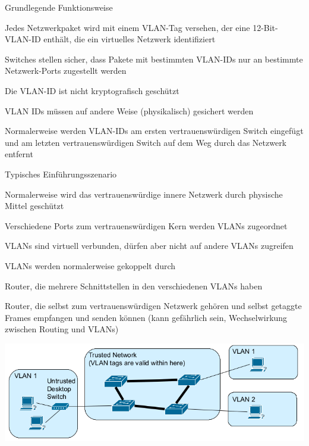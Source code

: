 \documentclass[a4paper]{article}
\begin{document}
\begin{multicols}{3}
      Grundlegende Funktionsweise
      \begin{itemize*}
            \item Jedes Netzwerkpaket wird mit einem VLAN-Tag versehen, der eine 12-Bit-VLAN-ID enthält, die ein virtuelles Netzwerk identifiziert
            \item Switches stellen sicher, dass Pakete mit bestimmten VLAN-IDs nur an bestimmte Netzwerk-Ports zugestellt werden %
            \item Die VLAN-ID ist nicht kryptografisch geschützt
            \item VLAN IDs müssen auf andere Weise (physikalisch) gesichert werden
            \item Normalerweise werden VLAN-IDs am ersten vertrauenswürdigen Switch eingefügt und am letzten vertrauenswürdigen Switch auf dem Weg durch das Netzwerk entfernt
      \end{itemize*}

      Typisches Einführungsszenario
      \begin{itemize*}
            \item Normalerweise wird das vertrauenswürdige innere Netzwerk durch physische Mittel geschützt
            \item Verschiedene Ports zum vertrauenswürdigen Kern werden VLANs zugeordnet
            \item VLANs sind virtuell verbunden, dürfen aber nicht auf andere VLANs zugreifen
            \item VLANs werden normalerweise gekoppelt durch
            \begin{itemize*}
                  \item Router, die mehrere Schnittstellen in den verschiedenen VLANs haben
                  \item Router, die selbst zum vertrauenswürdigen Netzwerk gehören und selbst getaggte Frames empfangen und senden können (kann gefährlich sein, Wechselwirkung zwischen Routing und VLANs)
            \end{itemize*}
            \item \includegraphics[width=.5\linewidth]{Assets/NetworkSecurity-ieee802.1q-scenario.png}
      \end{itemize*}


\end{multicols}
\end{document}
